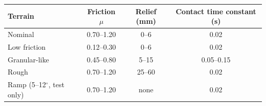 \begin{tabular}{@{}lccc@{}}
\toprule
Terrain & Friction $\mu$ & Relief (mm) & Contact time constant (s) \\ \midrule
Nominal & 0.70--1.20 & 0--6 & 0.02 \\
Low friction & 0.12--0.30 & 0--6 & 0.02 \\
Granular-like & 0.45--0.80 & 5--15 & 0.05--0.15 \\
Rough & 0.70--1.20 & 25--60 & 0.02 \\
Ramp (5--12$^\circ$, test only) & 0.70--1.20 & none & 0.02 \\
\bottomrule
\end{tabular}